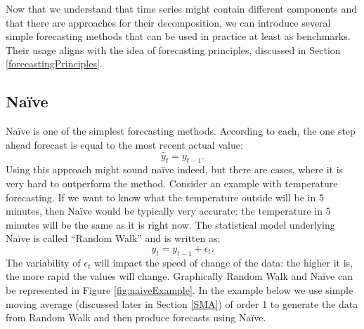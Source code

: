 \documentclass[
]{book}
\newenvironment{Shaded}{\begin{snugshade}}{\end{snugshade}}
\newcommand{\AttributeTok}[1]{\textcolor[rgb]{0.77,0.63,0.00}{#1}}
\newcommand{\ConstantTok}[1]{\textcolor[rgb]{0.00,0.00,0.00}{#1}}
\newcommand{\DecValTok}[1]{\textcolor[rgb]{0.00,0.00,0.81}{#1}}
\newcommand{\FunctionTok}[1]{\textcolor[rgb]{0.00,0.00,0.00}{#1}}
\newcommand{\NormalTok}[1]{#1}
\newcommand{\OtherTok}[1]{\textcolor[rgb]{0.56,0.35,0.01}{#1}}
\newcommand{\SpecialCharTok}[1]{\textcolor[rgb]{0.00,0.00,0.00}{#1}}
\newcommand{\StringTok}[1]{\textcolor[rgb]{0.31,0.60,0.02}{#1}}
\theoremstyle{definition}
\theoremstyle{definition}
\theoremstyle{definition}
\theoremstyle{definition}
\theoremstyle{remark}
\begin{document}
Now that we understand that time series might contain different components and that there are approaches for their decomposition, we can introduce several simple forecasting methods that can be used in practice at least as benchmarks. Their usage aligns with the idea of forecasting principles, discussed in Section \ref{forecastingPrinciples}.

\hypertarget{Naive}{%
\subsection{Naïve}\label{Naive}}

Naïve is one of the simplest forecasting methods. According to each, the one step ahead forecast is equal to the most recent actual value:
\begin{equation}
    \hat{y}_t = y_{t-1} .
    \label{eq:Naive}
\end{equation}
Using this approach might sound naïve indeed, but there are cases, where it is very hard to outperform the method. Consider an example with temperature forecasting. If we want to know what the temperature outside will be in 5 minutes, then Naïve would be typically very accurate: the temperature in 5 minutes will be the same as it is right now. The statistical model underlying Naïve is called ``Random Walk'' and is written as:
\begin{equation}
    y_t = y_{t-1} + \epsilon_t.
    \label{eq:RandomWalk}
\end{equation}
The variability of \(\epsilon_t\) will impact the speed of change of the data: the higher it is, the more rapid the values will change. Graphically Random Walk and Naïve can be represented in Figure \ref{fig:naiveExample}. In the example below we use simple moving average (discussed later in Section \ref{SMA}) of order 1 to generate the data from Random Walk and then produce forecasts using Naïve.

\begin{Shaded}
\end{Shaded}
\end{document}

